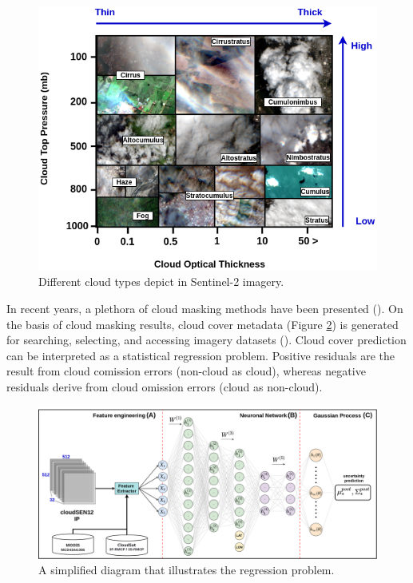 \documentclass[a4paper, nobind]{templates/cdethesis}
\begin{document}
\begin{figure}[!h]
    \centering
    \includegraphics[width=0.98\linewidth]{figures/chapter02/figure01.png}
    \caption{Different cloud types depict in Sentinel-2 imagery.}
    \label{fig:figure013}
\end{figure}

In recent years, a plethora of cloud masking methods have been presented (\cite{Hagolle2017, Domnich2021, Louis2016, Qiu2019, richter2019atmospheric, jan_wevers_2021_5788067, Lopez-Puigdollers2021, frantz2019force}). On the basis of cloud masking results, cloud cover metadata (Figure \ref{fig:figure014}) is generated for searching, selecting, and accessing imagery datasets (\cite{tiede2021investigating}). Cloud cover prediction can be interpreted as a statistical regression problem. Positive residuals are the result from cloud comission errors (non-cloud as cloud), whereas negative residuals derive from cloud omission errors (cloud as non-cloud).

\begin{figure}[!h]
    \centering
    \includegraphics[width=0.98\linewidth]{figures/chapter02/figure02.png}
    \caption{A simplified diagram that illustrates the  regression problem.}
    \label{fig:figure014}
\end{figure}
\end{document}
